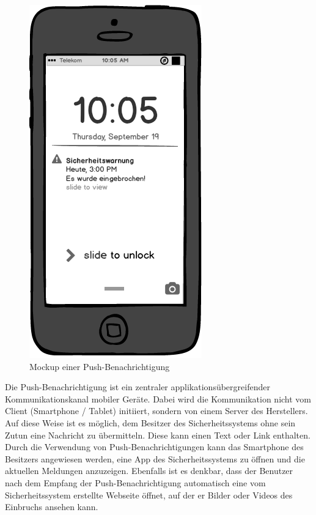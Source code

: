 \begin{figure}[H] 
	\centering
	\includegraphics[scale=0.5]{Bilder/alert}
	\caption{Mockup einer Push-Benachrichtigung}
	\label{f:alert}
\end{figure}

Die Push-Benachrichtigung ist ein zentraler applikationsübergreifender Kommunikationskanal mobiler Geräte. Dabei wird die Kommunikation nicht vom Client (Smartphone / Tablet) initiiert, sondern von einem Server des Herstellers. Auf diese Weise ist es möglich, dem Besitzer des Sicherheitssystems ohne sein Zutun eine Nachricht zu übermitteln. Diese kann einen Text oder Link enthalten.\\
Durch die Verwendung von Push-Benachrichtigungen kann das Smartphone des Besitzers angewiesen werden, eine App des Sicherheitssystems zu öffnen und die aktuellen Meldungen anzuzeigen. Ebenfalls ist es denkbar, dass der Benutzer nach dem Empfang der Push-Benachrichtigung automatisch eine vom Sicherheitssystem erstellte Webseite öffnet, auf der er Bilder oder Videos des Einbruchs ansehen kann.



